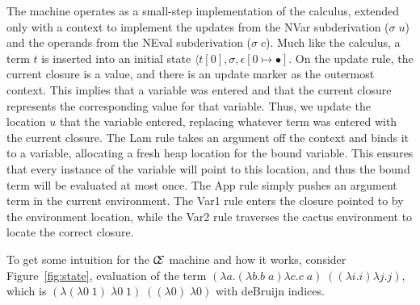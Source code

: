 The machine operates as a small-step implementation of the calculus, extended
only with a context to implement the updates from the NVar subderivation
($\sigma \; u$) and the operands from the NEval subderivation ($\sigma \; c$).
Much like the calculus, a term $t$ is inserted into an initial state $\langle
t[0], \sigma, \epsilon[0\mapsto\bullet]$. On the update rule, the current
closure is a value, and there is an update marker as the outermost context.
This implies that a variable was entered and that the current closure
represents the corresponding value for that variable. Thus, we update the
location $u$ that the variable entered, replacing whatever term was entered
with the current closure. The Lam rule takes an argument off the context and
binds it to a variable, allocating a fresh heap location for the bound
variable. This ensures that every instance of the variable will point to this
location, and thus the bound term will be evaluated at most once. The App rule
simply pushes an argument term in the current environment. The Var1 rule enters
the closure pointed to by the environment location, while the Var2 rule
traverses the cactus environment to locate the correct closure.  

To get some intuition for the $\mathcal{\mathcal{C} \mskip -4mu \mathcal{E}}$
machine and how it works, consider Figure~\ref{fig:state}, evaluation of the
term $(\lambda a.(\lambda b.b \; a) \lambda c.c \; a) \; ((\lambda i.i)
\lambda j.j)$, which is $(\lambda(\lambda0\;1)\;\lambda0\;1)\;((\lambda0)\;
\lambda0)$ with deBruijn indices.

